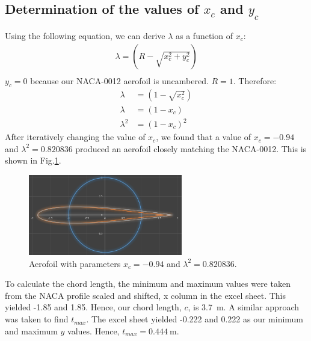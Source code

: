 \documentclass[11pt]{article}
\begin{document}
\subsection*{Determination of the values of $x_c$ and $y_c$ }
Using the following equation, we can derive $\lambda$ as a function of $x_c$:
\begin{align}
  \lambda = \left(R - \sqrt{x_c^2 + y_c^2}\right)\\
\end{align}
$y_c = 0$ because our NACA-0012 aerofoil is uncambered. $R = 1$. Therefore:
\begin{align}
  \lambda &= \left(1-\sqrt{x_c^2}\right)\\
  \lambda &= \left(1-x_c\right)\\
  \lambda^2 &= \left(1-x_c\right)^2
\end{align}
After iteratively changing the value of $x_c$, we found that a value of $x_c = -0.94$ and $\lambda^2 = 0.820836$ produced an aerofoil closely matching the NACA-0012. This is shown in Fig.\ref{mappedaerofoil}.
\begin{figure}[H]
  \centering
  \includegraphics[width = 0.6\textwidth]{./img/diagram15.png}
  \caption{Aerofoil with parameters $x_c = -0.94$ and $\lambda^2 = 0.820836$.}
  \label{mappedaerofoil}
\end{figure} 
To calculate the chord length, the minimum and maximum values were taken from the NACA profile scaled and shifted, x column in the excel sheet. This yielded -1.85 and 1.85. Hence, our chord length, $c$, is \SI{3.7}{\metre}. A similar approach was taken to find $t_{max}$. The excel sheet yielded -0.222 and 0.222 as our minimum and maximum $y$ values. Hence, $t_{max} = \SI{0.444}{\metre}$.
\end{document}
